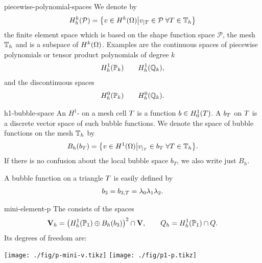 \begin{Notation}{piecewise-polynomial-spaces}
  We denote by
  \begin{gather}
    \label{eq:stokes:8}
    H^k_h(\mathcal P) =
    \bigl\{ v\in H^k(\Omega) \big\vert
    v_{|T} \in \mathcal P \;\forall T\in\mathbb T_h\bigr\}
  \end{gather}
  the finite element space which is based on the shape function space
  $\mathcal P$, the mesh $\mathbb T_h$ and is a subspace of
  $H^k(\Omega)$. Examples are the continuous spaces of piecewise
  polynomials or tensor product polynomials of degree $k$
  \begin{gather}
    H^1_h(\mathbb P_k) \qquad H^1_h(\mathbb Q_k),
  \end{gather}
  and the discontinuous spaces
  \begin{gather}
    H^0_h(\mathbb P_k) \qquad H^0_h(\mathbb Q_k).
  \end{gather}
\end{Notation}

\begin{Definition}{h1-bubble-space}
  An $H^1$- on a mesh cell $T$ is a
  function $b\in H^1_0(T)$. A  $b_T$ on
  $T$ is a discrete vector space of such bubble functions.  We
  denote the space of bubble functions on the mesh $\mathbb T_h$ by
  \begin{gather}
    B_h(b_T) = \bigl\{ v\in H^1(\Omega) \big\vert
    v_{|_T} \in b_T \;\forall T\in\mathbb T_h
    \bigr\}.
  \end{gather}
  If there is no confusion about the local bubble space $b_T$, we also
  write just $B_h$.
\end{Definition}

\begin{example}
  A bubble function on a triangle $T$ is easily defined by
  \begin{gather}
    \label{eq:stokes:7}
    b_3 = b_{3,T} = \lambda_0\lambda_1\lambda_2.
  \end{gather}
\end{example}

\begin{Definition}{mini-element-p}
  The  consists of the spaces
  \begin{gather}
    \mathbf V_h = \bigl(H^1_h(\mathbb P_1) \oplus B_h(b_3)\bigr)^2 \cap \mathbf V,
    \qquad
    Q_h = H^1_h(\mathbb P_1) \cap Q.
  \end{gather}
  Its degrees of freedom are:
  \begin{center}
    \texttt{[image: ./fig/p-mini-v.tikz]}
    \hspace{1cm}
    \texttt{[image: ./fig/p1-p.tikz]}
  \end{center}
\end{Definition}

